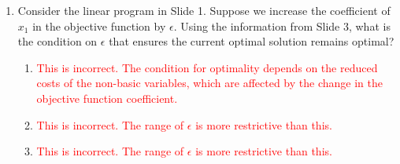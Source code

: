 \documentclass{article}%
\newcommand{\incorrect}[1]{\textcolor{red}{#1}}
\begin{document}
\begin{enumerate}
\begin{enumerate}
\item \incorrect{This is incorrect. There are constraints on $\epsilon$ to maintain optimality.}%
\end{enumerate}%
\vspace{1em}%
\item Consider the linear program in Slide 1. Suppose we increase the coefficient of $x_1$ in the objective function by $\epsilon$. Using the information from Slide 3, what is the condition on $\epsilon$ that ensures the current optimal solution remains optimal?%
\begin{enumerate}%
\item \incorrect{This is incorrect.  The condition for optimality depends on the reduced costs of the non-basic variables, which are affected by the change in the objective function coefficient.}%
\item \incorrect{This is incorrect. The range of $\epsilon$ is more restrictive than this.}%
\item \incorrect{This is incorrect. The range of $\epsilon$ is more restrictive than this.}%

\end{enumerate}
\end{enumerate}
\end{document}
